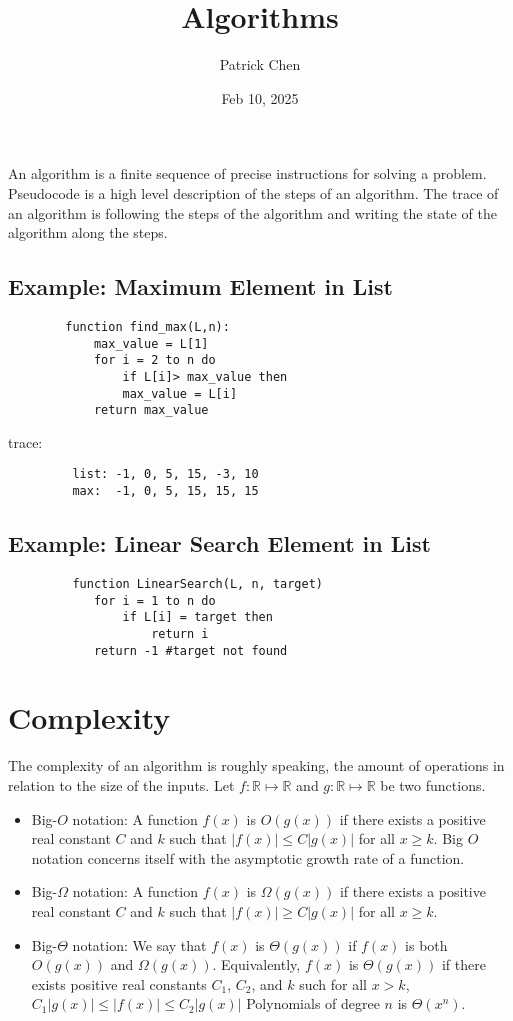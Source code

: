 \documentclass{article}
\title{Algorithms}
\author{Patrick Chen}
\date{Feb 10, 2025}
\theoremstyle{mytheoremstyle}
\theoremstyle{mytheoremstyle}
\theoremstyle{myproblemstyle}
\begin{document}
    \maketitle
    An algorithm is a finite sequence of precise instructions for solving a
    problem. Pseudocode is a high level description of the steps of an
    algorithm. The trace of an algorithm is following the steps of the algorithm
    and writing the state of the algorithm along the steps.
    \subsection*{Example: Maximum Element in List}
    \begin{verbatim}
        function find_max(L,n):
            max_value = L[1]
            for i = 2 to n do
                if L[i]> max_value then
                max_value = L[i]
            return max_value
    \end{verbatim}
    trace:
    \begin{verbatim}
         list: -1, 0, 5, 15, -3, 10
         max:  -1, 0, 5, 15, 15, 15
    \end{verbatim}

    \subsection*{Example: Linear Search Element in List}
    \begin{verbatim}
         function LinearSearch(L, n, target)
            for i = 1 to n do
                if L[i] = target then
                    return i
            return -1 #target not found
    \end{verbatim}

    \section*{Complexity}
    The complexity of an algorithm is roughly speaking, the amount of operations
    in relation to the size of the inputs.
    Let $f: \mathbb{R} \mapsto \mathbb{R}$ and $g:
            \mathbb{R} \mapsto \mathbb{R}$ be two functions.
    \begin{itemize}
        \item Big-$O$ notation: A function $f(x)$ is $O(g(x))$ if there exists a
            positive real constant $C$ and $k$ such that $|f(x)| \le C|g(x)|$
            for all $x\ge k$. Big $O$ notation concerns itself with the
            asymptotic growth rate of a function.
        \item Big-$\Omega$ notation: A function $f(x)$ is $\Omega(g(x))$ if
            there exists a positive real constant $C$ and $k$ such that $|f(x)|
            \ge C|g(x)|$ for all $x\ge k$.
        \item Big-$\Theta$ notation: We say that $f(x)$ is $\Theta(g(x))$ if
            $f(x)$ is both $O(g(x))$ and $\Omega(g(x))$. Equivalently, $f(x)$ is
            $\Theta(g(x))$ if there exists positive real constants $C_1$, $C_2$,
            and $k$ such for all $x>k$, $C_1|g(x)| \le |f(x)| \le C_2|g(x)|$
            Polynomials of degree $n$ is $\Theta(x^n)$.
    \end{itemize}
\end{document}
